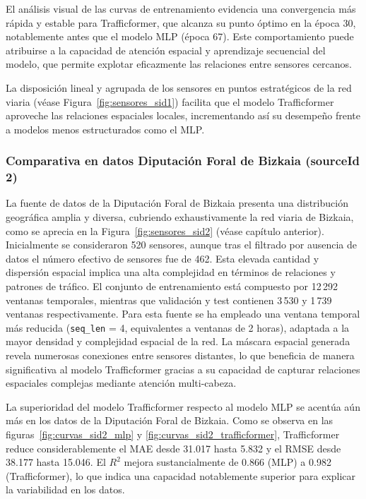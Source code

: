 El análisis visual de las curvas de entrenamiento evidencia una convergencia más rápida y estable para Trafficformer, que alcanza su punto óptimo en la época 30, notablemente antes que el modelo MLP (época 67). Este comportamiento puede atribuirse a la capacidad de atención espacial y aprendizaje secuencial del modelo, que permite explotar eficazmente las relaciones entre sensores cercanos.

La disposición lineal y agrupada de los sensores en puntos estratégicos de la red viaria (véase Figura~\ref{fig:sensores_sid1}) facilita que el modelo Trafficformer aproveche las relaciones espaciales locales, incrementando así su desempeño frente a modelos menos estructurados como el MLP.

\subsubsection*{Comparativa en datos Diputación Foral de Bizkaia (sourceId 2)}

La fuente de datos de la Diputación Foral de Bizkaia presenta una distribución geográfica amplia y diversa, cubriendo exhaustivamente la red viaria de Bizkaia, como se aprecia en la Figura~\ref{fig:sensores_sid2} (véase capítulo anterior). Inicialmente se consideraron 520 sensores, aunque tras el filtrado por ausencia de datos el número efectivo de sensores fue de 462. Esta elevada cantidad y dispersión espacial implica una alta complejidad en términos de relaciones y patrones de tráfico. El conjunto de entrenamiento está compuesto por 12\,292 ventanas temporales, mientras que validación y test contienen 3\,530 y 1\,739 ventanas respectivamente. Para esta fuente se ha empleado una ventana temporal más reducida (\texttt{seq\_len} = 4, equivalentes a ventanas de 2 horas), adaptada a la mayor densidad y complejidad espacial de la red. La máscara espacial generada revela numerosas conexiones entre sensores distantes, lo que beneficia de manera significativa al modelo Trafficformer gracias a su capacidad de capturar relaciones espaciales complejas mediante atención multi-cabeza.

La superioridad del modelo Trafficformer respecto al modelo MLP se acentúa aún más en los datos de la Diputación Foral de Bizkaia. Como se observa en las figuras~\ref{fig:curvas_sid2_mlp} y \ref{fig:curvas_sid2_trafficformer}, Trafficformer reduce considerablemente el MAE desde 31.017 hasta 5.832 y el RMSE desde 38.177 hasta 15.046. El $R^2$ mejora sustancialmente de 0.866 (MLP) a 0.982 (Trafficformer), lo que indica una capacidad notablemente superior para explicar la variabilidad en los datos.

